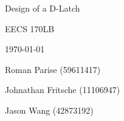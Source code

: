 \centering
\vspace{2.5cm}
{\huge Design of a D-Latch \par}
{\Large EECS 170LB \par}
{\Large \today \par}
\vspace{1cm}
{\large Roman Parise (59611417) \par}
{\large Johnathan Fritsche (11106947) \par}
{\large Jason Wang (42873192) \par}
\vspace{1cm}
